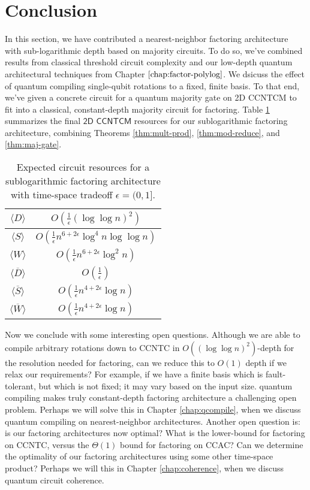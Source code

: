 \section{Conclusion}
\label{sec:fsl-conclude}

In this section, we have contributed a nearest-neighbor factoring architecture with
sub-logarithmic depth based on majority circuits. To do so, we've combined results from classical threshold
circuit complexity and our low-depth quantum architectural techniques from
Chapter $\ref{chap:factor-polylog}$.
We dsicuss the effect of quantum compiling single-qubit rotations to a fixed, finite basis.
To that end, we've given a concrete circuit for
a quantum majority gate on \textsf{2D CCNTCM} to fit into a classical, constant-depth majority circuit
for factoring. Table \ref{tab:sublog-resources} summarizes the final $\textsf{2D CCNTCM}$ resources for our sublogarithmic
factoring architecture, combining Theorems \ref{thm:mult-prod}, \ref{thm:mod-reduce}, and \ref{thm:maj-gate}.

\begin{table}[htb!]
\begin{tabular}{c|c|}
\hline
$\langle D \rangle$ & $O(\frac{1}{\epsilon}(\log\log n)^2)$ \\
\hline
$\langle S \rangle$ & $O(\frac{1}{\epsilon}n^{6 + 2\epsilon}\log^4 n\log\log n)$ \\
\hline
$\langle W \rangle$ & $O(\frac{1}{\epsilon}n^{6 + 2\epsilon}\log^2 n)$ \\
\hline
$\langle \overline{D} \rangle$ & $O(\frac{1}{\epsilon})$ \\
\hline
$\langle \overline{S} \rangle$ & $O(\frac{1}{\epsilon}n^{4+2\epsilon}\log n)$ \\
\hline
$\langle \overline{W} \rangle$ & $O(\frac{1}{\epsilon}n^{4+2\epsilon}\log n)$ \\
\hline
\end{tabular}
\caption{Expected circuit resources for a sublogarithmic factoring architecture with time-space tradeoff $\epsilon = (0,1]$.}
\label{tab:sublog-resources}
\end{table}

Now we conclude with some interesting open questions.
Although we are able to compile arbitrary rotations down to \textsf{CCNTC} in $O((\log \log n)^2)$-depth
for the resolution needed for factoring, can we reduce this to $O(1)$ depth if we relax our
requirements? For example, if we have a finite basis which is fault-tolerant, but which is not fixed;
it may vary based on the input size. quantum compiling makes truly constant-depth factoring architecture a challenging
open problem. Perhaps we will solve this in Chapter \ref{chap:qcompile}, when we discuss quantum compiling on
nearest-neighbor architectures.
Another open question is: is our factoring architectures now optimal?
What is the lower-bound for factoring on \textsf{CCNTC}, versus the $\Theta(1)$ bound for factoring on \textsf{CCAC}?
Can we determine the optimality of our factoring architectures using some other time-space product?
Perhaps we will this in Chapter \ref{chap:coherence}, when we discuss quantum circuit coherence. 

